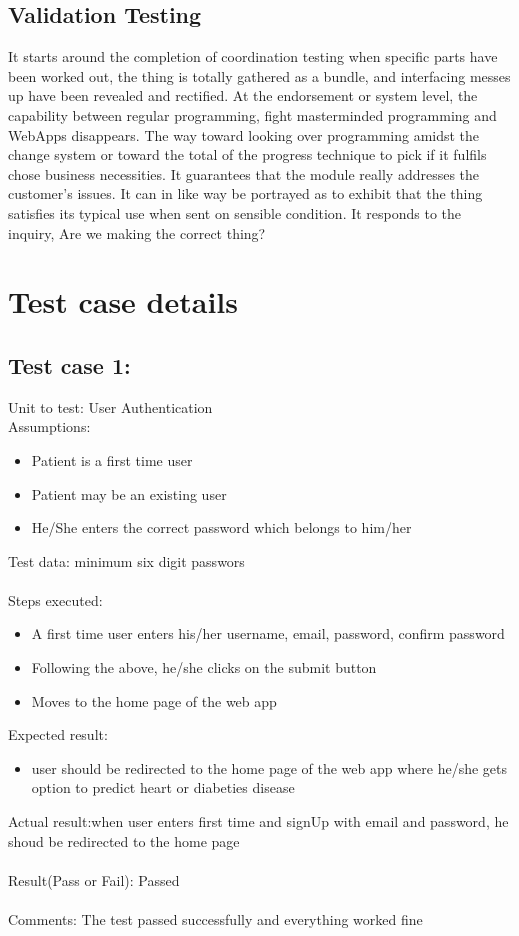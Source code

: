 \documentclass[oneside,12pt]{Classes/VTU}
\begin{document}
	\subsection{Validation Testing}
	It starts around the completion of coordination testing when specific parts have been worked out, the thing is totally gathered as a bundle, and interfacing messes up have been revealed and rectified. At the endorsement or system level, the capability between regular programming, fight masterminded programming and WebApps disappears. The way toward looking over programming amidst the change system or toward the total of the progress technique to pick if it fulfils chose business necessities. It guarantees that the module really addresses the customer's issues. It can in like way be portrayed as to exhibit that the thing satisfies its typical use when sent on sensible condition. It responds to the inquiry, Are we making the correct thing?
	
		\section{Test case details}
	\subsection{Test case 1:}
	Unit to test: User Authentication\\
	Assumptions:\\
	\begin{itemize}
		\item Patient is a first time user
		\item Patient may be an existing user
		\item He/She enters the correct password which belongs to him/her
	\end{itemize}
	Test data: minimum six digit passwors\\
	\\
	Steps executed:
	\begin{itemize}
		\item A first time user enters his/her username, email, password, confirm password
		\item Following the above, he/she clicks on the submit button
		\item Moves to the home page of the web app
	\end{itemize}
	Expected result:
	\begin{itemize}
		\item user should be redirected to the home page of the web app where he/she gets option to predict heart or diabeties disease
	\end{itemize}
	Actual result:when user enters first time and signUp with email and password, he shoud be redirected to the home page\\
	\\
	Result(Pass or Fail): Passed\\
	\\
	Comments: The test passed successfully and everything worked fine
	
\end{document}

